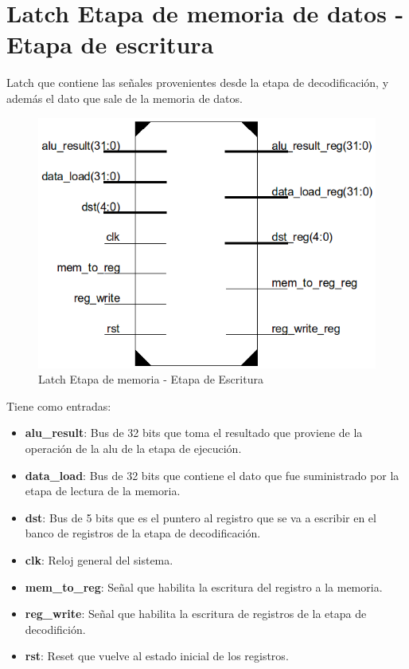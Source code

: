 \section{Latch Etapa de memoria de datos - Etapa de escritura}
Latch que contiene las señales provenientes desde la etapa de decodificaci\'on, y adem\'as el dato que sale de la memoria de datos.

\begin{figure}[H]
\centering
\includegraphics[scale=0.5]{img/latch_m_wb}
\caption{Latch Etapa de memoria - Etapa de Escritura}
\label{fig:latch_m_wb}
\end{figure}

Tiene como entradas:
\begin{itemize}
  \item \textbf{alu\_result}: Bus de 32 bits que toma el resultado que proviene de la operaci\'on de la alu de la etapa de ejecuci\'on.
  \item \textbf{data\_load}: Bus de 32 bits que contiene el dato que fue suministrado por la etapa de lectura de la memoria.
  \item \textbf{dst}: Bus de 5 bits que es el puntero al registro que se va a escribir en el banco de registros de la etapa de decodificaci\'on.
  \item \textbf{clk}: Reloj general del sistema.
  \item \textbf{mem\_to\_reg}: Señal que habilita la escritura del registro a la memoria.
  \item \textbf{reg\_write}: Señal que habilita la escritura de registros de la etapa de decodifici\'on.
  \item \textbf{rst}: Reset que vuelve al estado inicial de los registros. 
\end{itemize} 